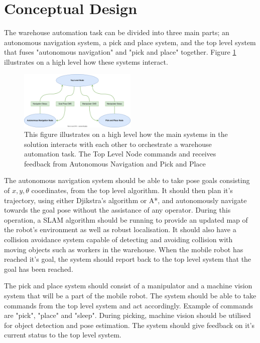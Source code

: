 \section{Conceptual Design}\label{sec:M:ConceptualDesign}
The warehouse automation task can be divided into three main parts; an autonomous navigation system, a pick and place system, and the top level system that fuses "autonomous navigation" and "pick and place" together. Figure \ref{fig:M:CD:topLevelMethod} illustrates on a high level how these systems interact.

\begin{figure}[H]
    \centering
    \includegraphics[width = 0.5\textwidth]{Figures/figTopLevelMethod.drawio.svg}
    \caption{This figure illustrates on a high level how the main systems in the solution interacts with each other to orchestrate a warehouse automation task. The Top Level Node commands and receives feedback from Autonomous Navigation and Pick and Place}
    \label{fig:M:CD:topLevelMethod}
\end{figure}

The autonomous navigation system should be able to take pose goals consisting of $x,y,\theta$ coordinates, from the top level algorithm. It should then plan it's trajectory, using either Djikstra's algorithm or A*, and autonomously navigate towards the goal pose without the assistance of any operator. During this operation, a SLAM algorithm should be running to provide an updated map of the robot's environment as well as robust localisation. It should also have a collision avoidance system capable of detecting and avoiding collision with moving objects such as workers in the warehouse. When the mobile robot has reached it's goal, the system should report back to the top level system that the goal has been reached.

The pick and place system should consist of a manipulator and a machine vision system that will be a part of the mobile robot. The system should be able to take commands from the top level system and act accordingly. Example of commands are "pick", "place" and "sleep". During picking, machine vision should be utilised for object detection and pose estimation. The system should give feedback on it's current status to the top level system.

